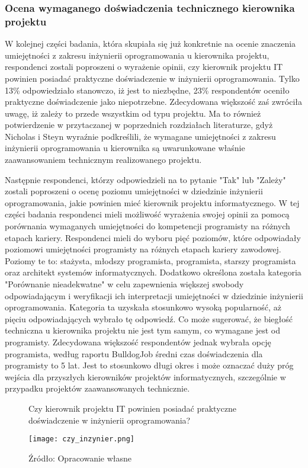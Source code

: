 \subsubsection{Ocena wymaganego doświadczenia technicznego kierownika projektu}
W kolejnej części badania, która skupiała się już konkretnie na ocenie znaczenia umiejętności z zakresu inżynierii oprogramowania u kierownika projektu, respondenci zostali poproszeni o wyrażenie opinii, czy kierownik projektu IT powinien posiadać praktyczne doświadczenie w inżynierii oprogramowania. Tylko 13\% odpowiedziało stanowczo, iż jest to niezbędne, 23\% respondentów oceniło praktyczne doświadczenie jako niepotrzebne. Zdecydowana większość zaś zwróciła uwagę, iż zależy to przede wszystkim od typu projektu. Ma to również potwierdzenie w przytaczanej w poprzednich rozdziałach literaturze, gdyż Nicholas i Steyn\autocite{NicholasSteyn} wyraźnie podkreślili, że wymagane umiejętności z zakresu inżynierii oprogramowania u kierownika są uwarunkowane właśnie zaawansowaniem technicznym realizowanego projektu.

Następnie respondenci, którzy odpowiedzieli na to pytanie "Tak" lub "Zależy" zostali poproszeni o ocenę poziomu umiejętności w dziedzinie inżynierii oprogramowania, jakie powinien mieć kierownik projektu informatycznego. W tej części badania respondenci mieli możliwość wyrażenia swojej opinii za pomocą porównania wymaganych umiejętności do kompetencji programisty na różnych etapach kariery. Respondenci mieli do wyboru pięć poziomów, które odpowiadały poziomowi umiejętności programisty na różnych etapach kariery zawodowej. Poziomy te to: stażysta, młodszy programista, programista, starszy programista oraz architekt systemów informatycznych. Dodatkowo określona została kategoria "Porównanie nieadekwatne" w celu zapewnienia większej swobody odpowiadającym i weryfikacji ich interpretacji umiejętności w dziedzinie inżynierii oprogramowania. Kategoria ta uzyskała stosunkowo wysoką popularność, aż pięciu odpowiadających wybrało tę odpowiedź. Co może sugerować, że biegłość techniczna u kierownika projektu nie jest tym samym, co wymagane jest od programisty. Zdecydowana większość respondentów jednak wybrała opcję programista, według raportu BulldogJob średni czas doświadczenia dla programisty to 5 lat\autocite{BulldogJob}. Jest to stosunkowo długi okres i może oznaczać duży próg wejścia dla przyszłych kierowników projektów informatycznych, szczególnie w przypadku projektów zaawansowanych technicznie.

\begin{figure}
  \caption{Czy kierownik projektu IT powinien posiadać praktyczne doświadczenie w inżynierii oprogramowania?}
  \centering
  \texttt{[image: czy\_inzynier.png]}
  \caption*{Źródło: Opracowanie własne}
\end{figure}


